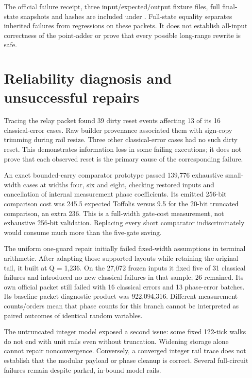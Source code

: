 \documentclass[11pt,letterpaper]{article}
\begin{document}
The official failure receipt, three input/expected/output fixture files, full final-state snapshots and hashes are included under . Full-state equality separates inherited failures from regressions on these packets. It does not establish all-input correctness of the point-adder or prove that every possible long-range rewrite is safe.


\section{Reliability diagnosis and unsuccessful repairs}

Tracing the relay packet found 39 dirty reset events affecting 13 of its 16 classical-error cases. Raw builder provenance associated them with sign-copy trimming during rail resize. Three other classical-error cases had no such dirty reset. This demonstrates information loss in some failing executions; it does not prove that each observed reset is the primary cause of the corresponding failure.


An exact bounded-carry comparator prototype passed 139,776 exhaustive small-width cases at widths four, six and eight, checking restored inputs and cancellation of internal measurement phase coefficients. Its emitted 256-bit comparison cost was 245.5 expected Toffolis versus 9.5 for the 20-bit truncated comparison, an extra 236. This is a full-width gate-cost measurement, not exhaustive 256-bit validation. Replacing every short comparator indiscriminately would consume much more than the five-gate saving.


The uniform one-guard repair initially failed fixed-width assumptions in terminal arithmetic. After adapting those supported layouts while retaining the original tail, it built at Q = 1,236. On the 27,072 frozen inputs it fixed five of 31 classical failures and introduced no new classical failures in that sample; 26 remained. Its own official packet still failed with 16 classical errors and 13 phase-error batches. Its baseline-packet diagnostic product was 922,094,316. Different measurement counts/orders mean that phase counts for this branch cannot be interpreted as paired outcomes of identical random variables.


The untruncated integer model exposed a second issue: some fixed 122-tick walks do not end with unit rails even without truncation. Widening storage alone cannot repair nonconvergence. Conversely, a converged integer rail trace does not establish that the modular payload or phase cleanup is correct. Several full-circuit failures remain despite parked, in-bound model rails.
\end{document}
